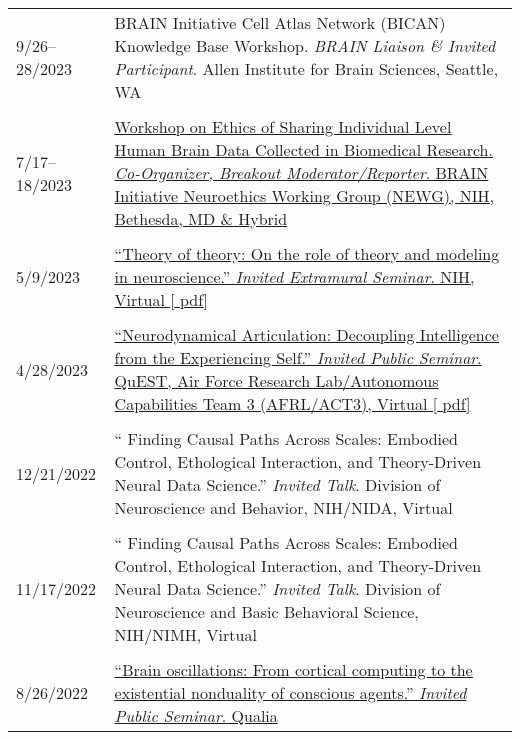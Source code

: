 \documentclass[10pt]{article}
\newcommand{\itemtitle}[1]{{\color{hopkinsblue}\ul{#1}}}
\newcommand{\unpubtitle}[1]{{\color{hopkinsblue} #1}}
\begin{document}
\begin{longtable}{@{\hspace{0.2in}}l>{\raggedright\arraybackslash}p{}}
  9/26--28/2023 & BRAIN Initiative Cell Atlas Network (BICAN)
  Knowledge Base Workshop. \emph{BRAIN Liaison \& Invited Participant}. Allen
  Institute for Brain Sciences, Seattle, WA \\
  \tabularnewline
  7/17--18/2023 \hspace{0.2in} &
  \href{https://event.roseliassociates.com/brain-newg-ws-july-2023/}
  {\itemtitle{Workshop on Ethics of Sharing Individual Level Human Brain
    Data Collected in Biomedical Research}. \emph{Co-Organizer, Breakout
    Moderator/Reporter}. BRAIN Initiative Neuroethics Working Group (NEWG), NIH,
  Bethesda, MD \& Hybrid} \\
  \tabularnewline
  5/9/2023 \hspace{0.2in} & 
  \href{https://jdmonaco.com/files/monaco_TheoryOfTheory_slides.pdf}
  {``\itemtitle{Theory of theory: On the role of
  theory and modeling in neuroscience}.'' \emph{Invited Extramural Seminar}.
  NIH, Virtual [\unpubtitle{pdf}]} \\
  \tabularnewline
  4/28/2023 \hspace{0.3in} & 
  \href{https://jdmonaco.com/files/monaco-2023-afrl-quest-slides.pdf}
  {``\itemtitle{Neurodynamical Articulation: Decoupling Intelligence from the
  Experiencing Self}.'' \emph{Invited Public Seminar}. QuEST, Air Force Research
  Lab/Autonomous Capabilities Team 3 (AFRL/ACT3), Virtual [\unpubtitle{pdf}]} \\
  \tabularnewline
  12/21/2022 \hspace{0.3in} & ``\unpubtitle{Finding Causal Paths Across Scales:
  Embodied Control, Ethological Interaction, and Theory-Driven Neural Data
  Science}.'' \emph{Invited Talk}. Division of Neuroscience and Behavior,
  NIH/NIDA, Virtual \\
  \tabularnewline
  11/17/2022 \hspace{0.3in} & ``\unpubtitle{Finding Causal Paths Across Scales:
  Embodied Control, Ethological Interaction, and Theory-Driven Neural Data
  Science}.'' \emph{Invited Talk}. Division of Neuroscience and Basic Behavioral
  Science, NIH/NIMH, Virtual \\
  \tabularnewline
  8/26/2022 \hspace{0.3in} &
  \href{https://jdmonaco.com/files/monaco-2022-afrl-quest-slides.pdf}
  {``\itemtitle{Brain oscillations: From cortical computing to the existential
  nonduality of conscious agents}.'' \emph{Invited Public Seminar}. Qualia
}
\end{longtable}
\end{document}
